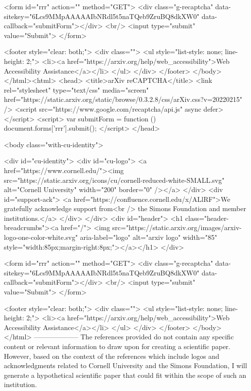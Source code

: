        <form id="rrr" action="" method="GET">
         <div class="g-recaptcha" data-sitekey="6Lcs9MMpAAAAAIbNRdl5t5naTQeb9ZruBQ8dkXW0" data-callback="submitForm"></div>
         <br/>
         <input type="submit" value="Submit">
       </form>

       <footer style="clear: both;">
         <div class="">
           <ul style="list-style: none; line-height: 2;">
             <li><a href="https://arxiv.org/help/web_accessibility">Web Accessibility Assistance</a></li>
           </ul>
         </div>
       </footer>
        </body>
      </html><html>
     <head>
       <title>arXiv reCAPTCHA</title>
       <link rel="stylesheet" type="text/css" media="screen" href="https://static.arxiv.org/static/browse/0.3.2.8/css/arXiv.css?v=20220215" />
       <script src="https://www.google.com/recaptcha/api.js" async defer></script>
       <script>
         var submitForm = function () {
             document.forms['rrr'].submit();
         }
       </script>
     </head>

     <body class="with-cu-identity">

       <div id="cu-identity">
         <div id="cu-logo">
           <a href="https://www.cornell.edu/"><img src="https://static.arxiv.org/icons/cu/cornell-reduced-white-SMALL.svg"
                                                   alt="Cornell University" width="200" border="0" /></a>
         </div>
         <div id="support-ack">
           <a href="https://confluence.cornell.edu/x/ALlRF">We gratefully acknowledge support from<br />
             the Simons Foundation and member institutions.</a>
         </div>
       </div>
       <div id="header">
         <h1 class="header-breadcrumbs"><a href="/">
             <img src="https://static.arxiv.org/images/arxiv-logo-one-color-white.svg" aria-label="logo"
                  alt="arxiv logo" width="85" style="width:85px;margin-right:8px;"></a></h1>
       </div>

       <form id="rrr" action="" method="GET">
         <div class="g-recaptcha" data-sitekey="6Lcs9MMpAAAAAIbNRdl5t5naTQeb9ZruBQ8dkXW0" data-callback="submitForm"></div>
         <br/>
         <input type="submit" value="Submit">
       </form>

       <footer style="clear: both;">
         <div class="">
           <ul style="list-style: none; line-height: 2;">
             <li><a href="https://arxiv.org/help/web_accessibility">Web Accessibility Assistance</a></li>
           </ul>
         </div>
       </footer>
        </body>
      </html>
        --------------------
         The references provided do not contain any specific content or relevant information to draw upon for creating a scientific paper. However, based on the context of the references which include logos and acknowledgments related to Cornell University and the Simons Foundation, I will generate a hypothetical scientific paper that could fit within the scope of such an institution. 

